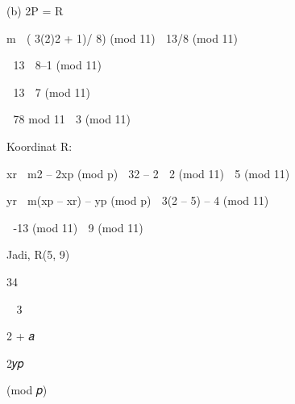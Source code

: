 \documentclass{article}
\begin{document}

(b) 2P = R




  m  ( 3(2)2 + 1)/ 8) (mod 11)  13/8 (mod 11)





               13  8–1 (mod 11)






  13  7 (mod 11) 





               78 mod 11  3 (mod 11)

Koordinat R:

  xr  m2 – 2xp  (mod p)  32 – 2  2  (mod 11)  5 (mod 11)

     yr  m(xp – xr) – yp (mod p)  3(2 – 5) – 4 (mod 11) 





  -13  (mod 11)  9 (mod 11)

 Jadi, R(5, 9)  






34

𝑚 3𝑥𝑝

2 + 𝑎

2𝑦𝑝

 (mod 𝑝)
\end{document}
